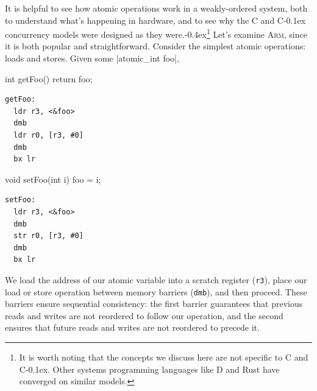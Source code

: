 \documentclass[fontsize=10pt, oneside]{scrartcl}
\newcommand{\punckern}{\kern-0.4ex}
\newcommand{\monobox}[1]{\mbox{\texttt{#1}}}
\newcommand{\keyword}[1]{\monobox{\color{darkGreen}#1}}
\newcommand{\cplusplus}[1]{C\kern-0.1ex\raisebox{0.15ex}{\texttt{++}}}
\newcommand{\clang}[1]{C}
\begin{document}
It is helpful to see how atomic operations work in a weakly-ordered system,
both to understand what's happening in hardware,
and to see why the \clang{} and \cplusplus{} concurrency models were designed as they were.\punckern\footnote{%
It is worth noting that the concepts we discuss here are not specific to \clang{} and \cplusplus{}.
Other systems programming languages like D and Rust have converged on similar models.}
Let's examine \textsc{Arm}, since it is both popular and straightforward.
Consider the simplest atomic operations: loads and stores.
Given some \cc|atomic_int foo|,
\newline
\begin{minipage}{0.35\linewidth}
\begin{ccode}
int getFoo()
{
    return foo;
}
\end{ccode}
\end{minipage}\hfill
{}\hfill
\begin{minipage}{0.43\linewidth}
\begin{lstlisting}[language={[ARM]Assembler}]
getFoo:
  ldr r3, <&foo>
  dmb
  ldr r0, [r3, #0]
  dmb
  bx lr
\end{lstlisting}
\end{minipage}
\begin{minipage}{0.35\linewidth}
\begin{ccode}
void setFoo(int i)
{
    foo = i;
}
\end{ccode}
\end{minipage}\hfill
{}\hfill
\begin{minipage}{0.43\linewidth}
\begin{lstlisting}[language={[ARM]Assembler}]
setFoo:
  ldr r3, <&foo>
  dmb
  str r0, [r3, #0]
  dmb
  bx lr
\end{lstlisting}
\end{minipage}
We load the address of our atomic variable into a scratch register (\texttt{r3}),
place our load or store operation between memory barriers (\keyword{dmb}), and then proceed.
These barriers ensure sequential consistency:
the first barrier guarantees that previous reads and writes are not reordered to follow our operation,
and the second ensures that future reads and writes are not reordered to precede it.
\end{document}
